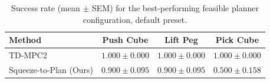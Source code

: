 \begin{table}[t]
\centering
\begin{tabular}{lccc}
\toprule
Method & Push Cube & Lift Peg & Pick Cube \\
\midrule
TD-MPC2 & $1.000 \pm 0.000$ & $1.000 \pm 0.000$ & $1.000 \pm 0.000$ \\
Squeeze-to-Plan (Ours) & $0.900 \pm 0.095$ & $0.900 \pm 0.095$ & $0.500 \pm 0.158$ \\
\bottomrule
\end{tabular}
\caption{Success rate (mean $\pm$ SEM) for the best-performing feasible planner configuration, default preset.}
\label{tab:latency_vs_success_rate_default}
\end{table}

